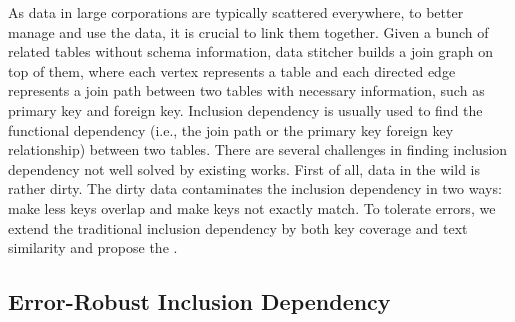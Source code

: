 As data in large corporations are typically scattered everywhere, to better manage and use the data, it is crucial to link them together. Given a bunch of related tables without schema information, data stitcher builds a join graph on top of them, where each vertex represents a table and each directed edge represents a join path between two tables with necessary information, such as primary key and foreign key. 
Inclusion dependency is usually used to find the functional dependency (i.e., the join path or the primary key foreign key relationship) between two tables. There are several challenges in finding inclusion dependency not well solved by existing works. First of all, data in the wild is rather dirty. The dirty data contaminates the inclusion dependency in two ways: make less keys overlap and make keys not exactly match. To tolerate errors, we extend the traditional inclusion dependency by both key coverage and text similarity and propose the \emph{\eind}. %








\subsection{Error-Robust Inclusion Dependency}\label{subsec:eind}

